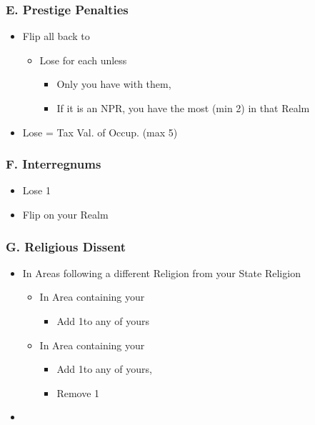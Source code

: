 \documentclass[10pt]{article}
\begin{document}
\framebreak

\subsubsection*{E. Prestige Penalties}
\begin{itemize}
	\item Flip all \disputedsuccession back to \marriage
	\begin{itemize}
		\item Lose  for each unless
		\begin{itemize}
			\item Only you have \alliance with them, 
			\item If it is an NPR, you have the most \influence (min 2) in that Realm
		\end{itemize}
	\end{itemize}
	\item Lose \prestige = Tax Val. of Occup. \towns (max 5)
\end{itemize}

\subsubsection*{F. Interregnums}
\begin{itemize}
	\item Lose 1\stability
	\item Flip \marriages on your Realm
\end{itemize}

\subsubsection*{G. Religious Dissent}
\begin{itemize}
	\item In Areas following a different Religion from your State Religion
	\begin{itemize}
		\item In  Area containing your \towns
		\begin{itemize}
			\item Add 1\unrest to any \town of yours
		\end{itemize}
		\item In  Area containing your \vassals
		\begin{itemize}
			\item Add 1\unrest to any \vassal of yours, 
			\item Remove 1\influence
		\end{itemize}
	\end{itemize}
	\item {}
\end{itemize}
\end{document}

